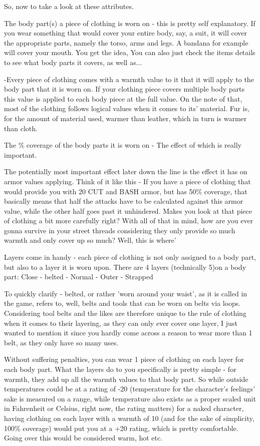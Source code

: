 \documentclass[11pt]{report}
\begin{document}
So, now to take a look at these attributes.

The body part(s) a piece of clothing is worn on - this is pretty self explanatory. If you wear something that would cover your entire body, say, a suit, it will cover the appropriate parts, namely the torso, arms and legs. A bandana for example will cover your mouth. You get the idea, You can also just check the items details to see what body parts it covers, as well as...

-Every piece of clothing comes with a warmth value to it that it will apply to the body part that it is worn on. If your clothing piece covers multiple body parts this value is applied to each body piece at the full value. On the note of that, most of the clothing follows logical values when it comes to its' material. Fur is, for the amount of material used, warmer than leather, which in turn is warmer than cloth.

The \% coverage of the body parts it is worn on - The effect of which is really important.

The potentially most important effect later down the line is the effect it has on armor values applying. Think of it like this - If you have a piece of clothing that would provide you with 20 CUT and BASH armor, but has 50\% coverage, that basically means that half the attacks have to be calculated against this armor value, while the other half goes past it unhindered. Makes you look at that piece of clothing a bit more carefully right? With all of that in mind, how are you ever gonna survive in your street threads considering they only provide so much warmth and only cover up so much? Well, this is where'

Layers come in handy - each piece of clothing is not only assigned to a body part, but also to a layer it is worn upon.
There are 4 layers (technically 5)on a body part: Close - belted - Normal - Outer - Strapped

To quickly clarify - belted, or rather 'worn around your waist', as it is called in the game, refers to, well, belts and tools that can be worn on belts via loops. Considering tool belts and the likes are therefore unique to the rule of clothing when it comes to their layering, as they can only ever cover one layer, I just wanted to mention it since you hardly come across a reason to wear more than 1 belt, as they only have so many uses.

Without suffering penalties, you can wear 1 piece of clothing on each layer for each body part. What the layers do to you specifically is pretty simple - for warmth, they add up all the warmth values to that body part. So while outside temperatures could be at a rating of -20 (temperature for the character's feelings' sake is measured on a range, while temperature also exists as a proper scaled unit in Fahrenheit or Celsius, right now, the rating matters) for a naked character, having clothing on each layer with a warmth of 10 (and for the sake of simplicity, 100\% coverage) would put you at a +20 rating, which is pretty comfortable. Going over this would be considered warm, hot etc.
\end{document}
